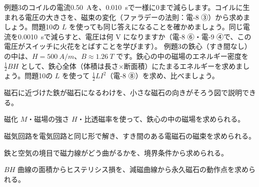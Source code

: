 \bkproblem 例題3のコイルの電流\qty{0.50}{A}を、\qty{0.010}{s}で一様に0まで減らします。コイルに生まれる電圧の大きさを、磁束の変化（ファラデーの法則：電-8 ③）から求めましょう。問題10の $L$ を使っても同じ答えになることを確かめましょう。同じ電流を\qty{0.0010}{s}で減らすと、電圧は何 V になりますか（電-8 ⑥・電-9 ④で、この電圧がスイッチに火花をとばすことを学びます）。
\bkproblem 例題3の鉄心（すき間なし）の中は、$H=\qty{500}{A/m}$、$B\approx\qty{1.26}{T}$ です。鉄心の中の磁場のエネルギー密度を $\tfrac12BH$ として、鉄心全体（体積は長さ×断面積）にたまるエネルギーを求めましょう。問題10の $L$ を使って $\tfrac12LI^2$（電-8 ⑧）を求め、比べましょう。

\begin{furikaeri}
\begin{checklist}
\item 磁石に近づけた鉄が磁石になるわけを、小さな磁石の向きがそろう図で説明できる。
\item 磁化 $M$・磁場の強さ $H$・比透磁率を使って、鉄心の中の磁場を求められる。
\item 磁気回路を電気回路と同じ形で解き、すき間のある電磁石の磁束を求められる。
\item 鉄と空気の境目で磁力線がどう曲がるかを、境界条件から求められる。
\item $BH$ 曲線の面積からヒステリシス損を、減磁曲線から永久磁石の動作点を求められる。
\end{checklist}
\end{furikaeri}
